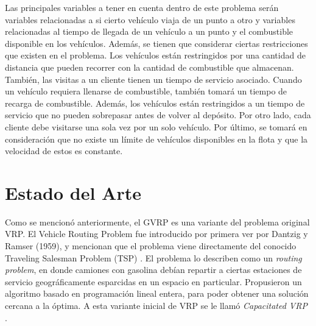 \documentclass[letter, 10pt]{article}
\begin{document}
Las principales variables a tener en cuenta dentro de este problema serán variables relacionadas a si cierto vehículo viaja de un punto a otro y variables relacionadas al tiempo de llegada de un vehículo a un punto y el combustible disponible en los vehículos. Además, se tienen que considerar ciertas restricciones que existen en el problema. Los vehículos están restringidos por una cantidad de distancia que pueden recorrer con la cantidad de combustible que almacenan. También, las visitas a un cliente tienen un tiempo de servicio asociado. Cuando un vehículo requiera llenarse de combustible, también tomará un tiempo de recarga de combustible. Además, los vehículos están restringidos a un tiempo de servicio que no pueden sobrepasar antes de volver al depósito. Por otro lado, cada cliente debe visitarse una sola vez por un solo vehículo. Por último, se tomará en consideración que no existe un límite de vehículos disponibles en la flota y que la velocidad de estos es constante.


\section{Estado del Arte}
\label{estado}
Como se mencionó anteriormente, el GVRP es una variante del problema original VRP. El Vehicle Routing Problem fue introducido por primera ver por Dantzig y Ramser (1959), y mencionan que el problema viene directamente del conocido Traveling Salesman Problem (TSP) \cite{RePEc:inm:ormnsc:v:6:y:1959:i:1:p:80-91}. El problema lo describen como un \emph{routing problem}, en donde camiones con gasolina debían repartir a ciertas estaciones de servicio geográficamente esparcidas en un espacio en particular. Propusieron un algoritmo basado en programación lineal entera, para poder obtener una solución cercana a la óptima. A esta variante inicial de VRP se le llamó \emph{Capacitated VRP} \cite{LIN20141118}.
\\
\end{document}
